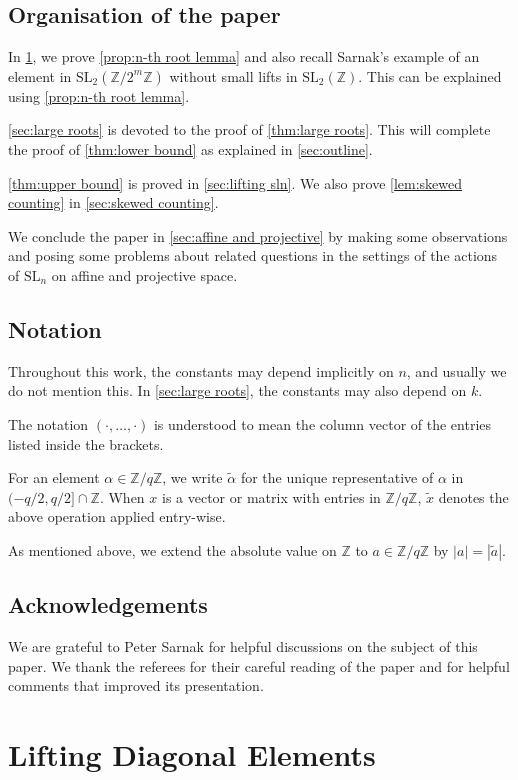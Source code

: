 \documentclass[12pt, a4paper]{amsart}
\numberwithin{equation}{section}
\theoremstyle{definition}
\newcommand{\Z}{\mathbb{Z}}
\newcommand{\SL}{\mathrm{SL}}
\newcommand{\wt}{\widetilde}
\begin{document}
\subsection{Organisation of the paper}

In \cref{sec:diagonal}, we prove \cref{prop:n-th root lemma} and also recall
Sarnak's example \cite{sarnak2015lettermiller} of an element
in $\SL_2(\Z/2^m\Z)$ without small lifts in
$\SL_2(\Z)$.
This can be explained using \cref{prop:n-th root lemma}.

\cref{sec:large roots} is devoted to the proof of \cref{thm:large roots}.
This will complete the proof of \cref{thm:lower bound}
as explained in \cref{sec:outline}.

\cref{thm:upper bound} is proved in \cref{sec:lifting sln}.
We also prove \cref{lem:skewed counting} in \cref{sec:skewed counting}.

We conclude the paper in \cref{sec:affine and projective} by making some
observations and posing some problems about related questions in the settings
of the actions of $\SL_n$ on affine and projective space.

\subsection{Notation}
Throughout this work, the constants may depend implicitly on $n$, and usually we do not mention this. In \cref{sec:large roots}, the constants may also depend on $k$. 

The notation $(\cdot,\ldots, \cdot)$ is understood to mean the column vector of
the entries listed inside the brackets.

For an element $\alpha\in\Z/q\Z$, we write
$\wt \alpha$ for the unique representative of $\alpha$ in $(-q/2,q/2]\cap\Z$.
When $x$ is a vector or matrix with entries in $\Z/q\Z$, $\wt x$ denotes
the above operation applied entry-wise. 

As mentioned above, we extend the absolute value on $\Z$ to $a\in\Z/q\Z$ by $|a|=|\wt a|$.

\subsection*{Acknowledgements}
We are grateful to Peter Sarnak for helpful discussions on the subject of this paper.
We thank the referees for their careful reading of the paper and for helpful comments that
improved its presentation.


\section{Lifting Diagonal Elements}\label{sec:diagonal}
\end{document}
